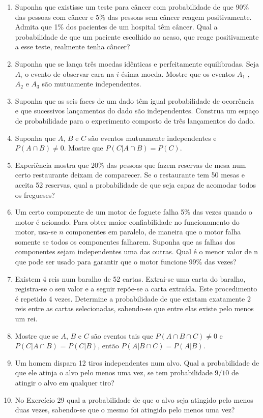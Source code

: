 \documentclass[../Notas.tex]{subfiles}
\begin{document}
\begin{enumerate}
\begin{enumerate}[a)]
    \end{enumerate}
    \item Suponha que existisse um teste para câncer com probabilidade de que 90\% das pessoas com câncer e 5\% das pessoas sem câncer reagem positivamente. Admita que 1\% dos pacientes de um hospital têm câncer. Qual a probabilidade de que um paciente escolhido ao acaso, que reage positivamente a esse teste, realmente tenha câncer?
    \item Suponha que se lança três moedas idênticas e perfeitamente equilibradas. Seja $A_i$ o evento de observar cara na $i$-ésima moeda. Mostre que os eventos $A_1$ , $A_2$ e $A_3$ são mutuamente independentes.
    \item Suponha que as seis faces de um dado têm igual probabilidade de ocorrência e que sucessivos lançamentos do dado são independentes. Construa um espaço de probabilidade para o experimento composto de três lançamentos do dado.
    \item Suponha que $A$, $B$ e $C$ são eventos mutuamente independentes e $P(A \cap B) \neq 0$. Mostre que $P(C|A \cap B) = P(C)$.
    \item Experiência mostra que 20\% das pessoas que fazem reservas de mesa num certo restaurante deixam de comparecer. Se o restaurante tem 50 mesas e aceita 52 reservas, qual a probabilidade de que seja capaz de acomodar todos os fregueses?
    \item Um certo componente de um motor de foguete falha 5\% das vezes quando o motor é acionado. Para obter maior confiabilidade no funcionamento do motor, usa-se $n$ componentes em paralelo, de maneira que o motor falha somente se todos os componentes falharem. Suponha que as falhas dos componentes sejam independentes uma das outras. Qual é o menor valor de n que pode ser usado para garantir que o motor funcione 99\% das vezes?
    \item Existem 4 reis num baralho de 52 cartas. Extrai-se uma carta do baralho, registra-se o seu valor e a seguir repõe-se a carta extraída. Este procedimento é repetido 4 vezes. Determine a probabilidade de que existam exatamente 2 reis entre as cartas selecionadas, sabendo-se que entre elas existe pelo menos um rei.
    \item Mostre que se $A$, $B$ e $C$ são eventos tais que $P(A \cap B \cap C) \neq 0$ e $P(C|A \cap B)$ = $P(C|B)$, então $P(A|B \cap C) = P(A|B)$.
    \item Um homem dispara 12 tiros independentes num alvo. Qual a probabilidade de que ele atinja o alvo pelo menos uma vez, se tem probabilidade $9/10$ de atingir o alvo em qualquer tiro?
    \item No Exercício 29 qual a probabilidade de que o alvo seja atingido pelo menos duas vezes, sabendo-se que o mesmo foi atingido pelo menos uma vez?
    \end{enumerate}
\end{document}

